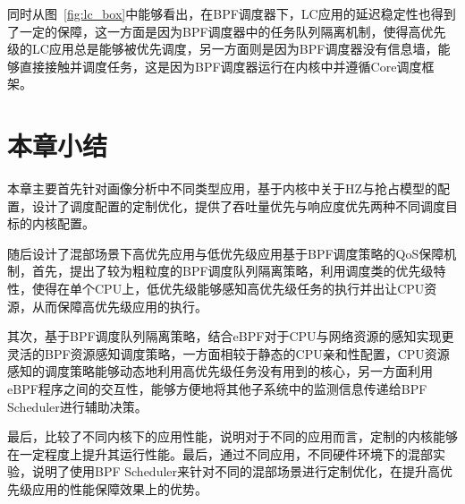 同时从图~\ref{fig:lc_box}中能够看出，在BPF调度器下，LC应用的延迟稳定性也得到了一定的保障，这一方面是因为BPF调度器中的任务队列隔离机制，使得高优先级的LC应用总是能够被优先调度，另一方面则是因为BPF调度器没有信息墙，能够直接接触并调度任务，这是因为BPF调度器运行在内核中并遵循Core调度框架。



\section{本章小结}

本章主要首先针对画像分析中不同类型应用，基于内核中关于HZ与抢占模型的配置，设计了调度配置的定制优化，提供了吞吐量优先与响应度优先两种不同调度目标的内核配置。

随后设计了混部场景下高优先应用与低优先级应用基于BPF调度策略的QoS保障机制，首先，提出了较为粗粒度的BPF调度队列隔离策略，利用调度类的优先级特性，使得在单个CPU上，低优先级能够感知高优先级任务的执行并出让CPU资源，从而保障高优先级应用的执行。

其次，基于BPF调度队列隔离策略，结合eBPF对于CPU与网络资源的感知实现更灵活的BPF资源感知调度策略，一方面相较于静态的CPU亲和性配置，CPU资源感知的调度策略能够动态地利用高优先级任务没有用到的核心，另一方面利用eBPF程序之间的交互性，能够方便地将其他子系统中的监测信息传递给BPF Scheduler进行辅助决策。

最后，比较了不同内核下的应用性能，说明对于不同的应用而言，定制的内核能够在一定程度上提升其运行性能。最后，通过不同应用，不同硬件环境下的混部实验，说明了使用BPF Scheduler来针对不同的混部场景进行定制优化，在提升高优先级应用的性能保障效果上的优势。